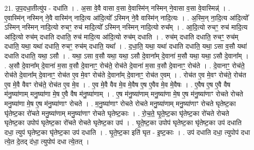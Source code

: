 \documentclass[17pt]{extarticle}
\begin{document}
21. उ॒प॒दधा॒तीत्यु॑प - दधा॑ति । . अ॒सा वे॒वै वासा व॒सा वे॒वास्मि॑न् नस्मिन् ने॒वासा व॒सा वे॒वास्मिन्न्॑ । . ए॒वास्मि॑न् नस्मिन् ने॒वै वास्मि॑न् नादि॒त्य आ॑दि॒त्यो᳚ ऽस्मिन् ने॒वै वास्मि॑न् नादि॒त्यः । . अ॒स्मि॒न् ना॒दि॒त्य आ॑दि॒त्यो᳚ ऽस्मिन् नस्मिन् नादि॒त्यो रुचꣳ॒॒ रुच॑ मादि॒त्यो᳚ ऽस्मिन् नस्मिन् नादि॒त्यो रुच᳚म् । . आ॒दि॒त्यो रुचꣳ॒॒ रुच॑ मादि॒त्य आ॑दि॒त्यो रुच॑म् दधाति दधाति॒ रुच॑ मादि॒त्य आ॑दि॒त्यो रुच॑म् दधाति । . रुच॑म् दधाति दधाति॒ रुचꣳ॒॒ रुच॑म् दधाति॒ यथा॒ यथा॑ दधाति॒ रुचꣳ॒॒ रुच॑म् दधाति॒ यथा᳚ । . द॒धा॒ति॒ यथा॒ यथा॑ दधाति दधाति॒ यथा॒ ऽसा व॒सौ यथा॑ दधाति दधाति॒ यथा॒ ऽसौ । . यथा॒ ऽसा व॒सौ यथा॒ यथा॒ ऽसौ दे॒वाना᳚म् दे॒वाना॑ म॒सौ यथा॒ यथा॒ ऽसौ दे॒वाना᳚म् । . अ॒सौ दे॒वाना᳚म् दे॒वाना॑ म॒सा व॒सौ दे॒वानाꣳ॒॒ रोच॑ते॒ रोच॑ते दे॒वाना॑ म॒सा व॒सौ दे॒वानाꣳ॒॒ रोच॑ते । . दे॒वानाꣳ॒॒ रोच॑ते॒ रोच॑ते दे॒वाना᳚म् दे॒वानाꣳ॒॒ रोच॑त ए॒व मे॒वꣳ रोच॑ते दे॒वाना᳚म् दे॒वानाꣳ॒॒ रोच॑त ए॒वम् । . रोच॑त ए॒व मे॒वꣳ रोच॑ते॒ रोच॑त ए॒व मे॒वै वैवꣳ रोच॑ते॒ रोच॑त ए॒व मे॒व । . ए॒व मे॒वै वैव मे॒व मे॒वैष ए॒ष ए॒वैव मे॒व मे॒वैषः । . ए॒वैष ए॒ष ए॒वै वैष म॑नु॒ष्या॑णाम् मनु॒ष्या॑णा मे॒ष ए॒वै वैष म॑नु॒ष्या॑णाम् । . ए॒ष म॑नु॒ष्या॑णाम् मनु॒ष्या॑णा मे॒ष ए॒ष म॑नु॒ष्या॑णाꣳ रोचते रोचते मनु॒ष्या॑णा मे॒ष ए॒ष म॑नु॒ष्या॑णाꣳ रोचते । . म॒नु॒ष्या॑णाꣳ रोचते रोचते मनु॒ष्या॑णाम् मनु॒ष्या॑णाꣳ रोचते घृतेष्ट॒का घृ॑तेष्ट॒का रो॑चते मनु॒ष्या॑णाम् मनु॒ष्या॑णाꣳ रोचते घृतेष्ट॒काः । . रो॒च॒ते॒ घृ॒ते॒ष्ट॒का घृ॑तेष्ट॒का रो॑चते रोचते घृतेष्ट॒का उपोप॑ घृतेष्ट॒का रो॑चते रोचते घृतेष्ट॒का उप॑ । . घृ॒ते॒ष्ट॒का उपोप॑ घृतेष्ट॒का घृ॑तेष्ट॒का उप॑ दधाति दधा॒ त्युप॑ घृतेष्ट॒का घृ॑तेष्ट॒का उप॑ दधाति । . घृ॒ते॒ष्ट॒का इति॑ घृत - इ॒ष्ट॒काः । . उप॑ दधाति दधा॒ त्युपोप॑ दधा त्ये॒त दे॒तद् द॑धा॒ त्युपोप॑ दधा त्ये॒तत् । \newline
\end{document}

